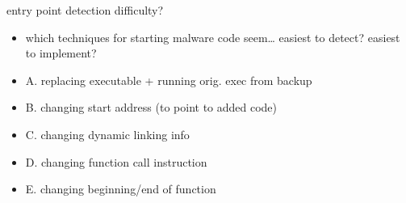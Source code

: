 \begin{frame}{entry point detection difficulty?}
    \begin{itemize}
    \item which techniques for starting malware code seem\ldots
        easiest to detect? easiest to implement?
    \vspace{.5cm}
    \item A. replacing executable + running orig. exec from backup
    \item B. changing start address (to point to added code)
    \item C. changing dynamic linking info
    \item D. changing function call instruction
    \item E. changing beginning/end of function
    \end{itemize}
\end{frame}
